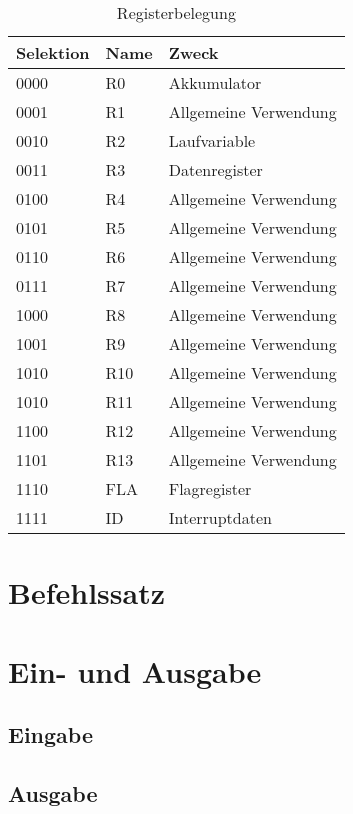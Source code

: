 \begin{table}[h]
\centering
\begin{tabular}{lll}
\toprule
Selektion & Name & Zweck\\
\midrule
0000 & R0  & Akkumulator\\
0001 & R1  & Allgemeine Verwendung\\
0010 & R2  & Laufvariable\\
0011 & R3  & Datenregister\\
0100 & R4  & Allgemeine Verwendung\\
0101 & R5  & Allgemeine Verwendung\\
0110 & R6  & Allgemeine Verwendung\\
0111 & R7  & Allgemeine Verwendung\\
1000 & R8  & Allgemeine Verwendung\\
1001 & R9  & Allgemeine Verwendung\\
1010 & R10 & Allgemeine Verwendung\\
1010 & R11 & Allgemeine Verwendung\\
1100 & R12 & Allgemeine Verwendung\\
1101 & R13 & Allgemeine Verwendung\\
1110 & FLA & Flagregister\\
1111 & ID  & Interruptdaten\\
\bottomrule
\end{tabular}
\caption{Registerbelegung}
\label{tab:registerbelegung}
\end{table}
\section{Befehlssatz}
\section{Ein- und Ausgabe}
\subsection{Eingabe}
\subsection{Ausgabe}
